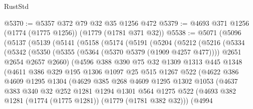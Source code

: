 \begin{lexlean}{RustStd}
\begin{coremodule}
@5370 := @5357 @372 @79 @32 @35 @1256 @472
@5379 := @4693 @371 @1256 (@1774 (@1775 @1256)) (@1779 (@1781 @371 @32))
@5538 := @5071
    (@5096
      (@5137
        (@5139
          (@5141
            (@5158
              (@5174
                (@5191
                  (@5204
                    (@5212
                      (@5216
                        (@5334
                          (@5342
                            (@5350
                              (@5355 (@5364 (@5370 @5379 (@1909 @4257 @477))))
                              @2651
                              @2654
                              @2657
                              @2660)
                            (@4596
                              @388
                              @390
                              @75
                              @32
                              @1309
                              @1313
                              @445
                              @1348
                              (@4611
                                @386
                                @329
                                @195
                                @1306
                                @1097
                                @25
                                @515
                                @1267
                                @522
                                (@4622
                                  @386
                                  @4609
                                  @1295
                                  @1304
                                  (@4629
                                    @385
                                    @268
                                    @4609
                                    @1295
                                    @1302
                                    @1053
                                    (@4637
                                      @383
                                      @340
                                      @32
                                      @252
                                      @1281
                                      @1294
                                      @1301
                                      @564
                                      @1275
                                      @522
                                      (@4693
                                        @382
                                        @1281
                                        (@1774 (@1775 @1281))
                                        (@1779 (@1781 @382 @32)))
                                      (@4994

\end{coremodule}
\end{lexlean}
